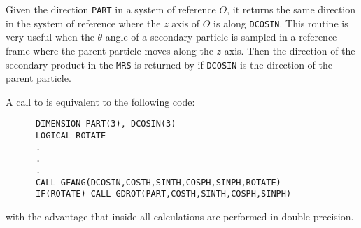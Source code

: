 Given the direction {\tt PART} in a system of reference $O$, it returns the
same direction in the system of reference where the $z$ axis of $O$ is
along {\tt DCOSIN}. This routine is very useful when the $\theta$
angle of a secondary particle is sampled in a reference frame where the
parent particle moves along the $z$ axis. Then the direction of the
secondary product in the {\tt MRS} is returned by  if
{\tt DCOSIN} is the direction of the parent particle.

A call to  is equivalent to the following code:
\begin{verbatim}
      DIMENSION PART(3), DCOSIN(3)
      LOGICAL ROTATE
      .
      .
      .
      CALL GFANG(DCOSIN,COSTH,SINTH,COSPH,SINPH,ROTATE)
      IF(ROTATE) CALL GDROT(PART,COSTH,SINTH,COSPH,SINPH)
\end{verbatim}

with the advantage that inside  all calculations are performed
in double precision.
